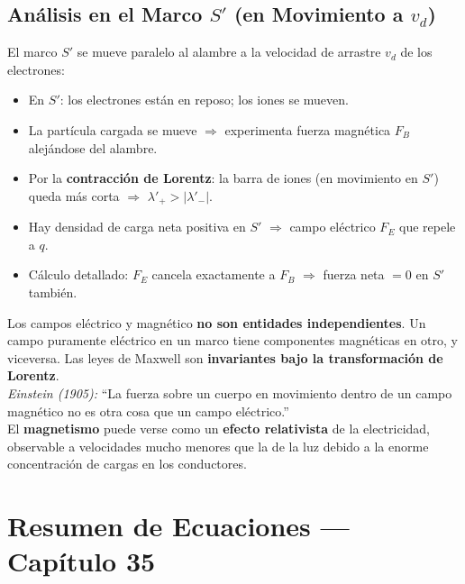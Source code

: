 \documentclass[12pt, letterpaper]{report}
\numberwithin{equation}{section}
\begin{document}
\subsection{Análisis en el Marco $S'$ (en Movimiento a $v_d$)}

El marco $S'$ se mueve paralelo al alambre a la velocidad de arrastre $v_d$
de los electrones:

\begin{itemize}[leftmargin=1.8em, itemsep=2pt]
  \item En $S'$: los electrones están en reposo; los iones se mueven.
  \item La partícula cargada se mueve $\Rightarrow$ experimenta fuerza
        magnética $F_B$ alejándose del alambre.
  \item Por la \textbf{contracción de Lorentz}: la barra de iones
        (en movimiento en $S'$) queda más corta $\Rightarrow$
        $\lambda'_+>|\lambda'_-|$.
  \item Hay densidad de carga neta positiva en $S'$ $\Rightarrow$
        campo eléctrico $F_E$ que repele a $q$.
  \item Cálculo detallado: $F_E$ cancela exactamente a $F_B$
        $\Rightarrow$ fuerza neta $=0$ en $S'$ también.
\end{itemize}

\begin{tcolorbox}[propbox,
  title=Conclusión fundamental — Relatividad del electromagnetismo]
  Los campos eléctrico y magnético \textbf{no son entidades independientes}.
  Un campo puramente eléctrico en un marco tiene componentes magnéticas en
  otro, y viceversa. Las leyes de Maxwell son
  \textbf{invariantes bajo la transformación de Lorentz}.\\[5pt]
  \textit{Einstein (1905):} ``La fuerza sobre un cuerpo en movimiento
  dentro de un campo magnético no es otra cosa que un campo eléctrico.''\\[5pt]
  El \textbf{magnetismo} puede verse como un
  \textbf{efecto relativista} de la electricidad,
  observable a velocidades mucho menores que la de la luz debido a la
  enorme concentración de cargas en los conductores.
\end{tcolorbox}

\section*{Resumen de Ecuaciones — Capítulo 35}
\end{document}
